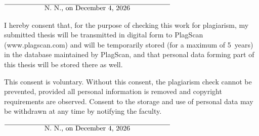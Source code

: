 \documentclass[
  12pt,
  a4paper,
  twoside=false,     %
  parskip,
  listof=totoc,      %
  bibliography=totoc %
]{scrbook}
\def\BaAuthor{Riya Biju}
\def\ShowBaAuthor{\BaAuthor}
\def\ShowBaAuthor{N.~N.}
\begin{document}
\vspace{20pt}
\begin{flushright}
$\overline{~~~~~~~~~~~~~~~~~\mbox{\ShowBaAuthor, on \today}~~~~~~~~~~~~~~~~~}$
\end{flushright}


I hereby consent that, for the purpose of checking this work for plagiarism,
my submitted thesis will be transmitted in digital form to PlagScan
(www.plagscan.com) and will be temporarily stored (for a maximum of
5~years) in the database maintained by PlagScan, and that personal data
forming part of this thesis will be stored there as well.

\begin{small}
This consent is voluntary. Without this consent, the plagiarism check
cannot be prevented, provided all personal information is removed and
copyright requirements are observed. Consent to the storage and use of
personal data may be withdrawn at any time by notifying the faculty.
\end{small}

\vspace{20pt}
\begin{flushright}
$\overline{~~~~~~~~~~~~~~~~~\mbox{\ShowBaAuthor, on \today}~~~~~~~~~~~~~~~~~}$
\end{flushright}
\end{document}
